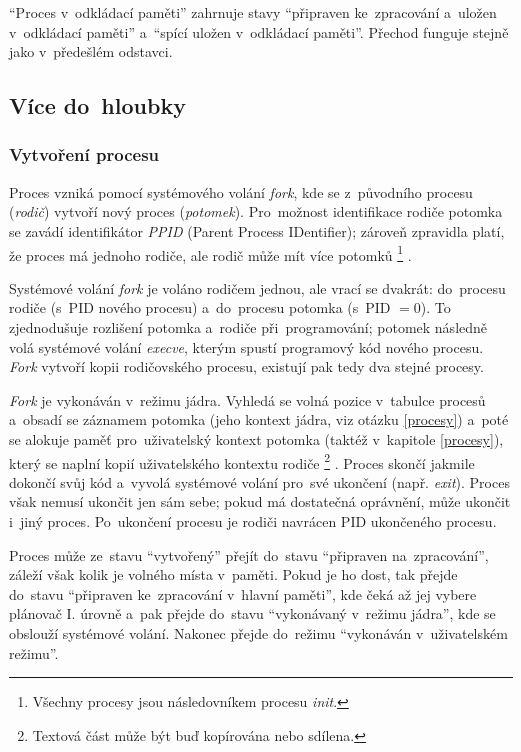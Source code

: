 \enquote{Proces v~odkládací paměti} zahrnuje stavy \enquote{připraven ke~zpracování a~uložen v~odkládací paměti} a~\enquote{spící uložen v~odkládací paměti}. Přechod funguje stejně jako v~předešlém odstavci.

\subsection{Více do~hloubky}

\subsubsection{Vytvoření procesu}

Proces vzniká pomocí systémového volání \emph{fork}, kde se z~původního procesu (\emph{rodič}) vytvoří nový proces (\emph{potomek}). Pro~možnost identifikace rodiče potomka se zavádí identifikátor \emph{PPID} (Parent Process IDentifier); zároveň zpravidla platí, že proces má jednoho rodiče, ale rodič může mít více potomků%
\footnote{Všechny procesy jsou následovníkem procesu \emph{init}.}%
.

Systémové volání \emph{fork} je voláno rodičem jednou, ale vrací se dvakrát: do~procesu rodiče (s~PID nového procesu) a~do~procesu potomka (s~PID $= 0$). To zjednodušuje rozlišení potomka a~rodiče při~programování; potomek následně volá systémové volání \emph{execve}, kterým spustí programový kód nového procesu. \emph{Fork} vytvoří kopii rodičovského procesu, existují pak tedy dva stejné procesy.

\emph{Fork} je vykonáván v~režimu jádra. Vyhledá se volná pozice v~tabulce procesů a~obsadí se záznamem potomka (jeho kontext jádra, viz otázku \ref{procesy}) a~poté se alokuje paměť pro~uživatelský kontext potomka (taktéž v~kapitole \ref{procesy}), který se naplní kopií uživatelského kontextu rodiče%
\footnote{Textová část může být buď kopírována nebo sdílena.}%
. Proces skončí jakmile dokončí svůj kód a~vyvolá systémové volání pro~své ukončení (např. \emph{exit}). Proces však nemusí ukončit jen sám sebe; pokud má dostatečná oprávnění, může ukončit i~jiný proces. Po~ukončení procesu je rodiči navrácen PID ukončeného procesu.

Proces může ze~stavu \enquote{vytvořený} přejít do~stavu \enquote{připraven na~zpracování}, záleží však kolik je volného místa v~paměti. Pokud je ho dost, tak přejde do~stavu \enquote{připraven ke~zpracování v~hlavní paměti}, kde čeká až jej vybere plánovač I. úrovně a~pak přejde do~stavu \enquote{vykonávaný v~režimu jádra}, kde se obslouží systémové volání. Nakonec přejde do~režimu \enquote{vykonáván v~uživatelském režimu}.

